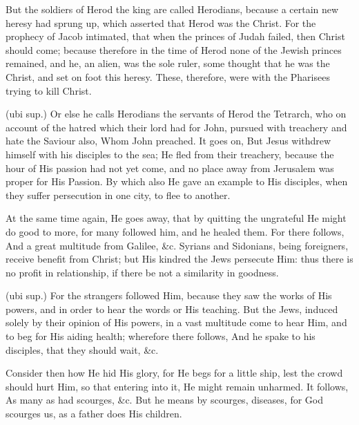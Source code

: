  But the soldiers of Herod the king are called Herodians, because a certain new heresy had sprung up, which asserted that Herod was the Christ. For the prophecy of Jacob intimated, that when the princes of Judah failed, then Christ should come; because therefore in the time of Herod none of the Jewish princes remained, and he, an alien, was the sole ruler, some thought that he was the Christ, and set on foot this heresy. These, therefore, were with the Pharisees trying to kill Christ.

 (ubi sup.) Or else he calls Herodians the servants of Herod the Tetrarch, who on account of the hatred which their lord had for John, pursued with treachery and hate the Saviour also, Whom John preached. It goes on, But Jesus withdrew himself with his disciples to the sea; He fled from their treachery, because the hour of His passion had not yet come, and no place away from Jerusalem was proper for His Passion. By which also He gave an example to His disciples, when they suffer persecution in one city, to flee to another.

 At the same time again, He goes away, that by quitting the ungrateful He might do good to more, for many followed him, and he healed them. For there follows, And a great multitude from Galilee, \&c. Syrians and Sidonians, being foreigners, receive benefit from Christ; but His kindred the Jews persecute Him: thus there is no profit in relationship, if there be not a similarity in goodness.

 (ubi sup.) For the strangers followed Him, because they saw the works of His powers, and in order to hear the words or His teaching. But the Jews, induced solely by their opinion of His powers, in a vast multitude come to hear Him, and to beg for His aiding health; wherefore there follows, And he spake to his disciples, that they should wait, \&c.

 Consider then how He hid His glory, for He begs for a little ship, lest the crowd should hurt Him, so that entering into it, He might remain unharmed. It follows, As many as had scourges, \&c. But he means by scourges, diseases, for God scourges us, as a father does His children.

